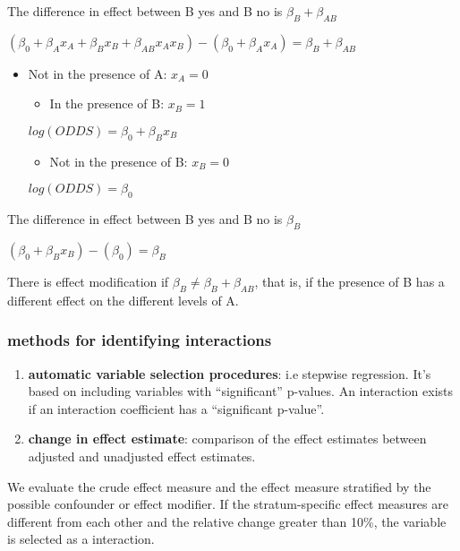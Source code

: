 \documentclass[
]{article}
\providecommand{\tightlist}{%
  \setlength{\itemsep}{0pt}\setlength{\parskip}{0pt}}
\begin{document}
The difference in effect between B yes and B no is
\(\beta_B + \beta_{AB}\)

\((\beta_0 +\beta_A x_A + \beta_B x_B + \beta_{AB} x_A x_B) - (\beta_0 +\beta_A x_A ) = \beta_B + \beta_{AB}\)

\begin{itemize}
\item
  Not in the presence of A: \(x_A = 0\)

  \begin{itemize}
  \tightlist
  \item
    In the presence of B: \(x_B = 1\)
  \end{itemize}

  \(log(ODDS) =\beta_0 + \beta_B x_B\)

  \begin{itemize}
  \tightlist
  \item
    Not in the presence of B: \(x_B = 0\)
  \end{itemize}

  \(log(ODDS) =\beta_0\)
\end{itemize}

The difference in effect between B yes and B no is \(\beta_B\)

\((\beta_0 + \beta_B x_B) - (\beta_0) = \beta_B\)

There is effect modification if \(\beta_B \ne \beta_B+ \beta_{AB}\),
that is, if the presence of B has a different effect on the different
levels of A.

\hypertarget{methods-for-identifying-interactions}{%
\subsubsection{methods for identifying
interactions}\label{methods-for-identifying-interactions}}

\begin{enumerate}
\def\labelenumi{\arabic{enumi}.}
\item
  \textbf{automatic variable selection procedures}: i.e stepwise
  regression. It's based on including variables with ``significant''
  p-values. An interaction exists if an interaction coefficient has a
  ``significant p-value''.
\item
  \textbf{change in effect estimate}: comparison of the effect estimates
  between adjusted and unadjusted effect estimates.
\end{enumerate}

We evaluate the crude effect measure and the effect measure stratified
by the possible confounder or effect modifier. If the stratum-specific
effect measures are different from each other and the relative change
greater than 10\%, the variable is selected as a interaction.
\end{document}
